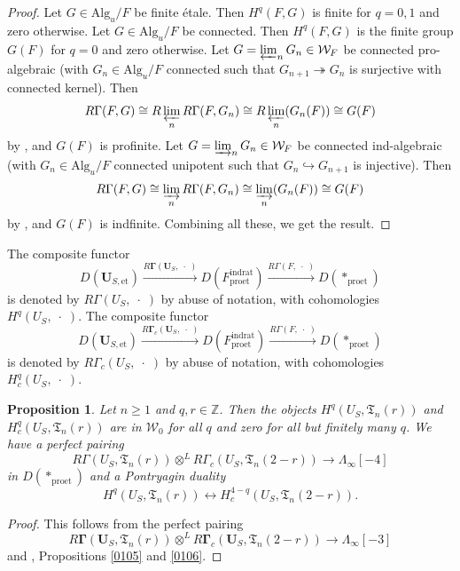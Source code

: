 \documentclass{amsart}
\newtheorem{Prop}[Thm]{Proposition}
\theoremstyle{remark}
\numberwithin{equation}{section}
\newcommand{\into}{\hookrightarrow}
\newcommand{\onto}{\twoheadrightarrow}
\newcommand{\tensor}{\mathbin{\otimes}}
\newcommand{\Z}{\mathbb{Z}}
\newcommand{\et}{\mathrm{et}}
\newcommand{\dirlim}{\varinjlim}
\newcommand{\invlim}{\varprojlim}
\newcommand{\rat}{\mathrm{rat}}
\newcommand{\ind}{\mathrm{ind}}
\newcommand{\pro}{\mathrm{pro}}
\newcommand{\Alg}{\mathrm{Alg}}
\newcommand{\alg}[1]{\mathbf{#1}}
\newcommand{\var}{\;\cdot\;}
\begin{document}
\begin{proof}
	Let $G \in \Alg_{u} / F$ be finite \'etale.
	Then $H^{q}(F, G)$ is finite for $q = 0, 1$ and zero otherwise.
	Let $G \in \Alg_{u} / F$ be connected.
	Then $H^{q}(F, G)$ is the finite group $G(F)$ for $q = 0$ and zero otherwise.
	Let $G = \invlim_{n} G_{n} \in \mathcal{W}_{F}$ be connected pro-algebraic
	(with $G_{n} \in \Alg_{u} / F$ connected
	such that $G_{n + 1} \onto G_{n}$ is surjective with connected kernel).
	Then
		\[
				R \Gamma(F, G)
			\cong
				R \invlim_{n}
					R \Gamma(F, G_{n})
			\cong
				R \invlim_{n}
					(G_{n}(F))
			\cong
				G(F)
		\]
	by \cite[Proposition (2.2.4) (b)]{Suz20},
	and $G(F)$ is profinite.
	Let $G = \dirlim_{n} G_{n} \in \mathcal{W}_{F}$ be connected ind-algebraic
	(with $G_{n} \in \Alg_{u} / F$ connected unipotent
	such that $G_{n} \into G_{n + 1}$ is injective).
	Then
		\[
				R \Gamma(F, G)
			\cong
				\dirlim_{n}
					R \Gamma(F, G_{n})
			\cong
				\dirlim_{n}
					(G_{n}(F))
			\cong
				G(F)
		\]
	by \cite[Proposition (2.2.4) (b)]{Suz20},
	and $G(F)$ is indfinite.
	Combining all these, we get the result.
\end{proof}

The composite functor
	\[
			D(\alg{U}_{S, \et})
		\stackrel{R \alg{\Gamma}(\alg{U}_{S}, \var)}{\longrightarrow}
			D(F^{\ind\rat}_{\pro\et})
		\stackrel{R \Gamma(F, \var)}{\longrightarrow}
			D(\ast_{\pro\et})
	\]
is denoted by $R \Gamma(U_{S}, \var)$ by abuse of notation,
with cohomologies $H^{q}(U_{S}, \var)$.
The composite functor
	\[
			D(\alg{U}_{S, \et})
		\stackrel{R \alg{\Gamma}_{c}(\alg{U}_{S}, \var)}{\longrightarrow}
			D(F^{\ind\rat}_{\pro\et})
		\stackrel{R \Gamma(F, \var)}{\longrightarrow}
			D(\ast_{\pro\et})
	\]
is denoted by $R \Gamma_{c}(U_{S}, \var)$ by abuse of notation,
with cohomologies $H^{q}_{c}(U_{S}, \var)$.

\begin{Prop}
	Let $n \ge 1$ and $q, r \in \Z$.
	Then the objects
	$H^{q}(U_{S}, \mathfrak{T}_{n}(r))$ and $H^{q}_{c}(U_{S}, \mathfrak{T}_{n}(r))$
	are in $\mathcal{W}_{0}$ for all $q$ and zero for all but finitely many $q$.
	We have a perfect pairing
		\[
					R \Gamma(U_{S}, \mathfrak{T}_{n}(r))
				\tensor^{L}
					R \Gamma_{c}(U_{S}, \mathfrak{T}_{n}(2 - r))
			\to
				\Lambda_{\infty}[-4]
		\]
	in $D(\ast_{\pro\et})$ and a Pontryagin duality
		\[
				H^{q}(U_{S}, \mathfrak{T}_{n}(r))
			\leftrightarrow
				H^{4 - q}_{c}(U_{S}, \mathfrak{T}_{n}(2 - r)).
		\]
\end{Prop}

\begin{proof}
	This follows from the perfect pairing
		\[
					R \alg{\Gamma}(\alg{U}_{S}, \mathfrak{T}_{n}(r))
				\tensor^{L}
					R \alg{\Gamma}_{c}(\alg{U}_{S}, \mathfrak{T}_{n}(2 - r))
			\to
				\Lambda_{\infty}[-3]
		\]
	and \cite[Proposition 4.2.1]{SuzCurve},
	Propositions \ref{0105} and \ref{0106}.
\end{proof}
\end{document}
